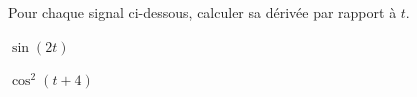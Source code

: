 
\finEntrainement










\hauteurLargeurCadreReponse		{8mm}{4cm}
\initialisationEntrainement

Pour chaque signal ci-dessous, calculer sa dérivée par rapport à $t$.

\debutEntrainement



\begin{enonce}
$\sin(2t)$
\end{enonce}





\begin{enonce}
$\cos^2(t+4)$
\end{enonce}


